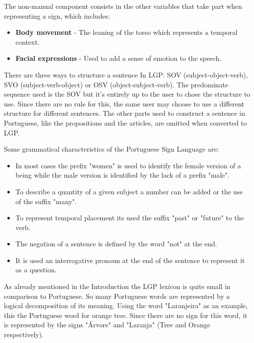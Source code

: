 The non-manual component consists in the other variables that take part when representing a sign, which includes:
\begin{itemize}
    \item \textbf{Body movement} - The leaning of the torso which represents a temporal context.
    \item \textbf{Facial expressions} - Used to add a sense of emotion to the speech.
\end{itemize}

There are three ways to structure a sentence In \gls{LGP}: SOV (subject-object-verb), SVO (subject-verb-object) or OSV (object-subject-verb).
The predominate sequence used is the SOV\cite{sousa2012interpretaccao}\cite{correia2015linguas} but it's entirely up to the user to chose the structure to use.
Since there are no rule for this, the same user may choose to use a different structure for different sentences\cite{martins2011letra}.
The other parts used to construct a sentence in Portuguese, like the propositions and the articles, are omitted when converted to \gls{LGP}\cite{bento2014avatares}.

Some grammatical characteristics of the Portuguese Sign Language are\cite{bento2014avatares}:
\begin{itemize}
    \item In most cases the prefix "women" is used to identify the female version of a being while the male version is identified by the lack of a prefix "male".
    \item To describe a quantity of a given subject a number can be added or the use of the suffix "many".
    \item To represent temporal placement its used the suffix "past" or "future" to the verb.
    \item The negation of a sentence is defined by the word "not" at the end.
    \item It is used an interrogative pronoun at the end of the sentence to represent it as a question.
\end{itemize}

As already mentioned in the Introduction the \gls{LGP} lexicon is quite small in comparison to Portuguese.
So many Portuguese words are represented by a logical decomposition of its meaning.
Using the word "Laranjeira" as an example, this the Portuguese word for orange tree.
Since there are no sign for this word, it is represented by the signs "Árvore" and "Laranja" (Tree and Orange respectively).

